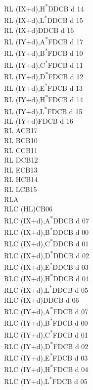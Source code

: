\documentclass[oneside,a4paper]{book}
\begin{document}
\begin{multicols}{3}
{\begin{tabbing}
RL (IX+d),H\textsuperscript{*}\>DDCB d 14\\
RL (IX+d),L\textsuperscript{*}\>DDCB d 15\\
RL (IX+d)\>DDCB d 16\\
RL (IY+d),A\textsuperscript{*}\>FDCB d 17\\
RL (IY+d),B\textsuperscript{*}\>FDCB d 10\\
RL (IY+d),C\textsuperscript{*}\>FDCB d 11\\
RL (IY+d),D\textsuperscript{*}\>FDCB d 12\\
RL (IY+d),E\textsuperscript{*}\>FDCB d 13\\
RL (IY+d),H\textsuperscript{*}\>FDCB d 14\\
RL (IY+d),L\textsuperscript{*}\>FDCB d 15\\
RL (IY+d)\>FDCB d 16\\
RL A\>CB17\\
RL B\>CB10\\
RL C\>CB11\\
RL D\>CB12\\
RL E\>CB13\\
RL H\>CB14\\
RL L\>CB15\\
RLA\\
RLC (HL)\>CB06\\
RLC (IX+d),A\textsuperscript{*}\>DDCB d 07\\
RLC (IX+d),B\textsuperscript{*}\>DDCB d 00\\
RLC (IX+d),C\textsuperscript{*}\>DDCB d 01\\
RLC (IX+d),D\textsuperscript{*}\>DDCB d 02\\
RLC (IX+d),E\textsuperscript{*}\>DDCB d 03\\
RLC (IX+d),H\textsuperscript{*}\>DDCB d 04\\
RLC (IX+d),L\textsuperscript{*}\>DDCB d 05\\
RLC (IX+d)\>DDCB d 06\\
RLC (IY+d),A\textsuperscript{*}\>FDCB d 07\\
RLC (IY+d),B\textsuperscript{*}\>FDCB d 00\\
RLC (IY+d),C\textsuperscript{*}\>FDCB d 01\\
RLC (IY+d),D\textsuperscript{*}\>FDCB d 02\\
RLC (IY+d),E\textsuperscript{*}\>FDCB d 03\\
RLC (IY+d),H\textsuperscript{*}\>FDCB d 04\\
RLC (IY+d),L\textsuperscript{*}\>FDCB d 05\\

\end{tabbing}}
\end{multicols}
\end{document}

